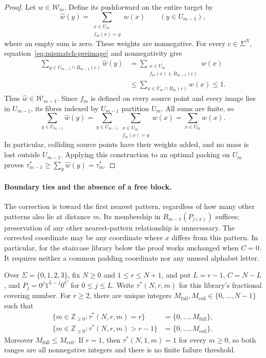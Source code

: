 \begin{proof}
Let $w\in\mathcal W_m$. Define its pushforward on the entire target by
\[
 \widehat w(y)=\sum_{\substack{x\in U_m\\f_m(x)=y}}w(x)
 \qquad(y\in U_{m-1}),
\]
where an empty sum is zero. These weights are nonnegative. For every
$c\in\Sigma^N$, equation~\eqref{eq:mismatch-preimage} and nonnegativity
give
\begin{align*}
 \sum_{y\in U_{m-1}\cap B_{m-1}(c)}\widehat w(y)
 &=\sum_{\substack{x\in U_m\\f_m(x)\in B_{m-1}(c)}}w(x)\\
 &\leq\sum_{x\in U_m\cap B_m(c)}w(x)\leq1.
\end{align*}
Thus $\widehat w\in\mathcal W_{m-1}$. Since $f_m$ is defined on every
source point and every image lies in $U_{m-1}$, its fibres indexed by
$U_{m-1}$ partition $U_m$. All sums are finite, so
\[
 \sum_{y\in U_{m-1}}\widehat w(y)
 =\sum_{y\in U_{m-1}}\sum_{\substack{x\in U_m\\f_m(x)=y}}w(x)
 =\sum_{x\in U_m}w(x).
\]
In particular, colliding source points have their weights added, and no
mass is lost outside $U_{m-1}$. Applying this construction to an optimal
packing on $U_m$ proves
$\tau_{m-1}^*\geq\sum_y\widehat w(y)=\tau_m^*$.
\end{proof}

\paragraph{Boundary ties and the absence of a free block.}
The correction is toward the first nearest pattern, regardless of how
many other patterns also lie at distance $m$. Its membership in
$B_{m-1}(P_{j(x)})$ suffices; preservation of any other nearest-pattern
relationship is unnecessary. The corrected coordinate may be any
coordinate where $x$ differs from this pattern. In particular, for the
staircase library below the proof works unchanged when $C=0$. It requires
neither a common padding coordinate nor any unused alphabet letter.

\begin{corollary}
\label{cor:mismatch-thresholds}
Over $\Sigma=\{0,1,2,3\}$, fix $N\geq0$ and $1\leq r\leq N+1$, and
put $L=r-1$, $C=N-L$, and $P_j=0^j1^{L-j}0^C$ for $0\leq j\leq L$.
Write $\tau^*(N,r,m)$ for this library's fractional covering number.
For $r\geq2$, there are unique integers
$M_{\mathrm{full}},M_{\mathrm{ceil}}\in\{0,\ldots,N-1\}$ such that
\begin{align*}
 \{m\in\mathbb Z_{\geq0}:\tau^*(N,r,m)=r\}
    &=\{0,\ldots,M_{\mathrm{full}}\},\\
 \{m\in\mathbb Z_{\geq0}:\tau^*(N,r,m)>r-1\}
    &=\{0,\ldots,M_{\mathrm{ceil}}\}.
\end{align*}
Moreover $M_{\mathrm{full}}\leq M_{\mathrm{ceil}}$. If $r=1$, then
$\tau^*(N,1,m)=1$ for every $m\geq0$, so both ranges are all nonnegative
integers and there is no finite failure threshold.
\end{corollary}

